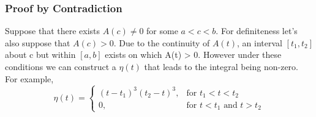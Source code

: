 \subsubsection{Proof by Contradiction}
Suppose that there exists $A(c) \neq 0$ for some $a < c < b$. For definiteness let's also suppose that $A(c) > 0$. Due to the continuity of $A(t)$, an interval $[t_{1},t_{2}]$ about c but within $[a,b]$ exists on which A(t) > 0. However under these conditions we can construct a $\eta(t)$ that leads to the integral being non-zero. For example,
\begin{equation} \label{deltadef}
\eta(t) =  
\begin{cases}
{(t-t_{1})}^{3}{(t_{2}-t)}^{3}, & \text{for } t_{1} < t < t_{2}\\
0, & \text{for } t < t_{1} \text{ and } t > t_{2}
\end{cases}
\end{equation}
